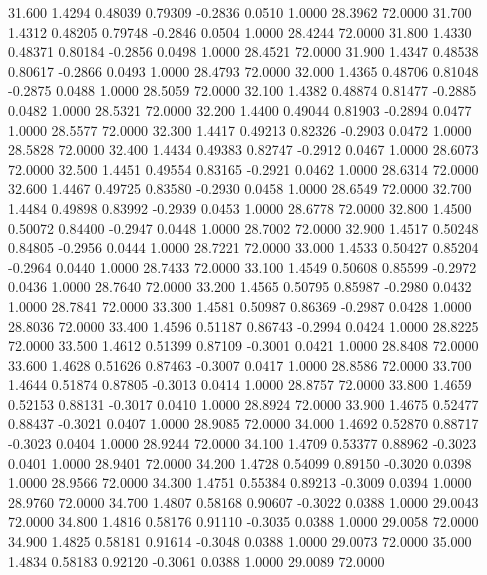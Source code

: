   31.600   1.4294   0.48039   0.79309  -0.2836   0.0510   1.0000  28.3962  72.0000
  31.700   1.4312   0.48205   0.79748  -0.2846   0.0504   1.0000  28.4244  72.0000
  31.800   1.4330   0.48371   0.80184  -0.2856   0.0498   1.0000  28.4521  72.0000
  31.900   1.4347   0.48538   0.80617  -0.2866   0.0493   1.0000  28.4793  72.0000
  32.000   1.4365   0.48706   0.81048  -0.2875   0.0488   1.0000  28.5059  72.0000
  32.100   1.4382   0.48874   0.81477  -0.2885   0.0482   1.0000  28.5321  72.0000
  32.200   1.4400   0.49044   0.81903  -0.2894   0.0477   1.0000  28.5577  72.0000
  32.300   1.4417   0.49213   0.82326  -0.2903   0.0472   1.0000  28.5828  72.0000
  32.400   1.4434   0.49383   0.82747  -0.2912   0.0467   1.0000  28.6073  72.0000
  32.500   1.4451   0.49554   0.83165  -0.2921   0.0462   1.0000  28.6314  72.0000
  32.600   1.4467   0.49725   0.83580  -0.2930   0.0458   1.0000  28.6549  72.0000
  32.700   1.4484   0.49898   0.83992  -0.2939   0.0453   1.0000  28.6778  72.0000
  32.800   1.4500   0.50072   0.84400  -0.2947   0.0448   1.0000  28.7002  72.0000
  32.900   1.4517   0.50248   0.84805  -0.2956   0.0444   1.0000  28.7221  72.0000
  33.000   1.4533   0.50427   0.85204  -0.2964   0.0440   1.0000  28.7433  72.0000
  33.100   1.4549   0.50608   0.85599  -0.2972   0.0436   1.0000  28.7640  72.0000
  33.200   1.4565   0.50795   0.85987  -0.2980   0.0432   1.0000  28.7841  72.0000
  33.300   1.4581   0.50987   0.86369  -0.2987   0.0428   1.0000  28.8036  72.0000
  33.400   1.4596   0.51187   0.86743  -0.2994   0.0424   1.0000  28.8225  72.0000
  33.500   1.4612   0.51399   0.87109  -0.3001   0.0421   1.0000  28.8408  72.0000
  33.600   1.4628   0.51626   0.87463  -0.3007   0.0417   1.0000  28.8586  72.0000
  33.700   1.4644   0.51874   0.87805  -0.3013   0.0414   1.0000  28.8757  72.0000
  33.800   1.4659   0.52153   0.88131  -0.3017   0.0410   1.0000  28.8924  72.0000
  33.900   1.4675   0.52477   0.88437  -0.3021   0.0407   1.0000  28.9085  72.0000
  34.000   1.4692   0.52870   0.88717  -0.3023   0.0404   1.0000  28.9244  72.0000
  34.100   1.4709   0.53377   0.88962  -0.3023   0.0401   1.0000  28.9401  72.0000
  34.200   1.4728   0.54099   0.89150  -0.3020   0.0398   1.0000  28.9566  72.0000
  34.300   1.4751   0.55384   0.89213  -0.3009   0.0394   1.0000  28.9760  72.0000
  34.700   1.4807   0.58168   0.90607  -0.3022   0.0388   1.0000  29.0043  72.0000
  34.800   1.4816   0.58176   0.91110  -0.3035   0.0388   1.0000  29.0058  72.0000
  34.900   1.4825   0.58181   0.91614  -0.3048   0.0388   1.0000  29.0073  72.0000
  35.000   1.4834   0.58183   0.92120  -0.3061   0.0388   1.0000  29.0089  72.0000

